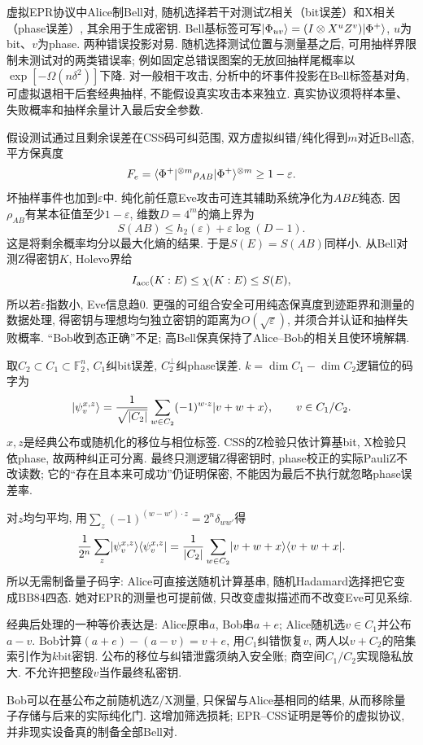 虚拟EPR协议中Alice制Bell对, 随机选择若干对测试Z相关（bit误差）和X相关（phase误差）, 其余用于生成密钥. Bell基标签可写$\lvert \Phi_{uv}\rangle=(I\otimes X^uZ^v)\lvert \Phi^+\rangle$, $u$为bit、$v$为phase. 两种错误投影对易. 随机选择测试位置与测量基之后, 可用抽样界限制未测试对的两类错误率; 例如固定总错误图案的无放回抽样尾概率以$\exp[-\Omega(n\delta^2)]$下降. 对一般相干攻击, 分析中的坏事件投影在Bell标签基对角, 可虚拟退相干后套经典抽样, 不能假设真实攻击本来独立. 真实协议须将样本量、失败概率和抽样余量计入最后安全参数.

假设测试通过且剩余误差在CSS码可纠范围, 双方虚拟纠错/纯化得到$m$对近Bell态, 平方保真度
\[F_e=\langle \Phi^+\rvert^{\otimes m}\rho_{AB}\lvert \Phi^+\rangle^{\otimes m}
 \ge1-\varepsilon.\]
坏抽样事件也加到$\varepsilon$中. 纯化前任意Eve攻击可连其辅助系统净化为$ABE$纯态. 因$\rho_{AB}$有某本征值至少$1-\varepsilon$, 维数$D=4^m$的熵上界为
\[S(AB)\le h_2(\varepsilon)+\varepsilon\log(D-1).\]
这是将剩余概率均分以最大化熵的结果. 于是$S(E)=S(AB)$同样小. 从Bell对测Z得密钥$K$, Holevo界给
\[I_{\rm acc}(K:E)\le\chi(K:E)\le S(E),\]
所以若$\varepsilon$指数小, Eve信息趋0. 更强的可组合安全可用纯态保真度到迹距界和测量的数据处理, 得密钥与理想均匀独立密钥的距离为$O(\sqrt\varepsilon)$, 并须合并认证和抽样失败概率. “Bob收到态正确”不足; 高Bell保真保持了Alice--Bob的相关且使环境解耦.

取$C_2\subset C_1\subset\mathbb F_2^n$, $C_1$纠bit误差, $C_2^\perp$纠phase误差. $k=\dim C_1-\dim C_2$逻辑位的码字为
\[\lvert \psi_v^{x,z}\rangle=\frac1{\sqrt{|C_2|}}\sum_{w\in C_2}
 (-1)^{w\cdot z}\lvert v+w+x\rangle,\qquad v\in C_1/C_2.\]
$x,z$是经典公布或随机化的移位与相位标签. CSS的Z检验只依计算基bit, X检验只依phase, 故两种纠正可分离. 最终只测逻辑Z得密钥时, phase校正的实际PauliZ不改读数; 它的“存在且本来可成功”仍证明保密, 不能因为最后不执行就忽略phase误差率.

对$z$均匀平均, 用$\sum_z(-1)^{(w-w')\cdot z}=2^n\delta_{ww'}$得
\[\frac1{2^n}\sum_z\lvert \psi_v^{x,z}\rangle\langle \psi_v^{x,z}\rvert
 =\frac1{|C_2|}\sum_{w\in C_2}\lvert v+w+x\rangle\langle v+w+x\rvert.\]
所以无需制备量子码字: Alice可直接送随机计算基串, 随机Hadamard选择把它变成BB84四态. 她对EPR的测量也可提前做, 只改变虚拟描述而不改变Eve可见系综.

经典后处理的一种等价表达是: Alice原串$a$, Bob串$a+e$; Alice随机选$v\in C_1$并公布$a-v$. Bob计算$(a+e)-(a-v)=v+e$, 用$C_1$纠错恢复$v$, 两人以$v+C_2$的陪集索引作为$k$bit密钥. 公布的移位与纠错泄露须纳入安全账; 商空间$C_1/C_2$实现隐私放大. 不允许把整段$v$当作最终私密钥.

Bob可以在基公布之前随机选Z/X测量, 只保留与Alice基相同的结果, 从而移除量子存储与后来的实际纯化门. 这增加筛选损耗; EPR--CSS证明是等价的虚拟协议, 并非现实设备真的制备全部Bell对.

